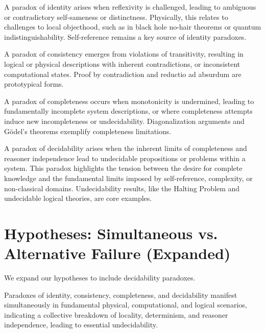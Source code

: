 	\begin{definition}
		A paradox of identity arises when reflexivity is challenged, leading to ambiguous or contradictory self-sameness or distinctness. Physically, this relates to challenges to local objecthood, such as in black hole no-hair theorems or quantum indistinguishability. Self-reference remains a key source of identity paradoxes.
	\end{definition}
	
	\begin{definition}
		A paradox of consistency emerges from violations of transitivity, resulting in logical or physical descriptions with inherent contradictions, or inconsistent computational states. Proof by contradiction and reductio ad absurdum are prototypical forms.
	\end{definition}
	
	\begin{definition}
		A paradox of completeness occurs when monotonicity is undermined, leading to fundamentally incomplete system descriptions, or where completeness attempts induce new incompleteness or undecidability. Diagonalization arguments and Gödel's theorems exemplify completeness limitations.
	\end{definition}
	
	\begin{definition}
		A paradox of decidability arises when the inherent limits of completeness and reasoner independence lead to undecidable propositions or problems within a system. This paradox highlights the tension between the desire for complete knowledge and the fundamental limits imposed by self-reference, complexity, or non-classical domains. Undecidability results, like the Halting Problem and undecidable logical theories, are core examples.
	\end{definition}
	
	
	\section{Hypotheses: Simultaneous vs. Alternative Failure (Expanded)}
	
	We expand our hypotheses to include decidability paradoxes.
	
	\begin{hypothesis}
		Paradoxes of identity, consistency, completeness, and decidability manifest simultaneously in fundamental physical, computational, and logical scenarios, indicating a collective breakdown of locality, determinism, and reasoner independence, leading to essential undecidability.
	\end{hypothesis}
	
